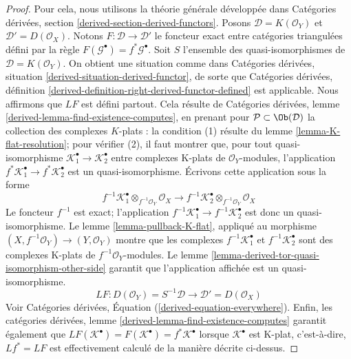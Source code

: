 {\begin{proof}
Pour cela, nous utilisons la théorie générale développée dans Catégories dérivées, section \ref{derived-section-derived-functors}. Posons $\mathcal{D} = K(\mathcal{O}_Y)$ et $\mathcal{D}' = D(\mathcal{O}_X)$. Notons $F : \mathcal{D} \to \mathcal{D}'$ le foncteur exact entre catégories triangulées défini par la règle
$F(\mathcal{G}^\bullet) = f^*\mathcal{G}^\bullet$. Soit $S$ l'ensemble des quasi-isomorphismes de
$\mathcal{D} = K(\mathcal{O}_Y)$. On obtient une situation comme dans Catégories dérivées, situation \ref{derived-situation-derived-functor},
de sorte que Catégories dérivées, définition
\ref{derived-definition-right-derived-functor-defined}
est applicable. Nous affirmons que $LF$ est défini partout. Cela résulte de Catégories dérivées, lemme \ref{derived-lemma-find-existence-computes},
en prenant pour $\mathcal{P} \subset \Ob(\mathcal{D})$ la collection des complexes $K$-plats : la condition (1) résulte du lemme \ref{lemma-K-flat-resolution};
pour vérifier (2), il faut montrer que, pour tout quasi-isomorphisme
$\mathcal{K}_1^\bullet  \to \mathcal{K}_2^\bullet$ entre complexes K-plats de $\mathcal{O}_Y$-modules, l'application
$f^*\mathcal{K}_1^\bullet  \to f^*\mathcal{K}_2^\bullet$ est un quasi-isomorphisme. Écrivons cette application sous la forme
$$
f^{-1}\mathcal{K}_1^\bullet \otimes_{f^{-1}\mathcal{O}_Y} \mathcal{O}_X
\longrightarrow
f^{-1}\mathcal{K}_2^\bullet \otimes_{f^{-1}\mathcal{O}_Y} \mathcal{O}_X
$$
Le foncteur $f^{-1}$ est exact; l'application
$f^{-1}\mathcal{K}_1^\bullet  \to f^{-1}\mathcal{K}_2^\bullet$ est donc un quasi-isomorphisme. Le lemme \ref{lemma-pullback-K-flat},
appliqué au morphisme $(X, f^{-1}\mathcal{O}_Y) \to (Y, \mathcal{O}_Y)$
montre que les complexes $f^{-1}\mathcal{K}_1^\bullet$ et $f^{-1}\mathcal{K}_2^\bullet$
sont des complexes K-plats de $f^{-1}\mathcal{O}_Y$-modules. Le lemme \ref{lemma-derived-tor-quasi-isomorphism-other-side}
garantit que l'application affichée est un quasi-isomorphisme.
$$
LF :
D(\mathcal{O}_Y) = S^{-1}\mathcal{D}
\longrightarrow
\mathcal{D}' = D(\mathcal{O}_X)
$$
Voir Catégories dérivées, Équation (\ref{derived-equation-everywhere}). Enfin, les catégories dérivées, lemme \ref{derived-lemma-find-existence-computes}
garantit également que
$LF(\mathcal{K}^\bullet) = F(\mathcal{K}^\bullet) = f^*\mathcal{K}^\bullet$
lorsque $\mathcal{K}^\bullet$ est K-plat, c'est-à-dire, $Lf^* = LF$ est effectivement calculé de la manière décrite ci-dessus.

\end{proof}

\begin{lemma}


\end{lemma}}
